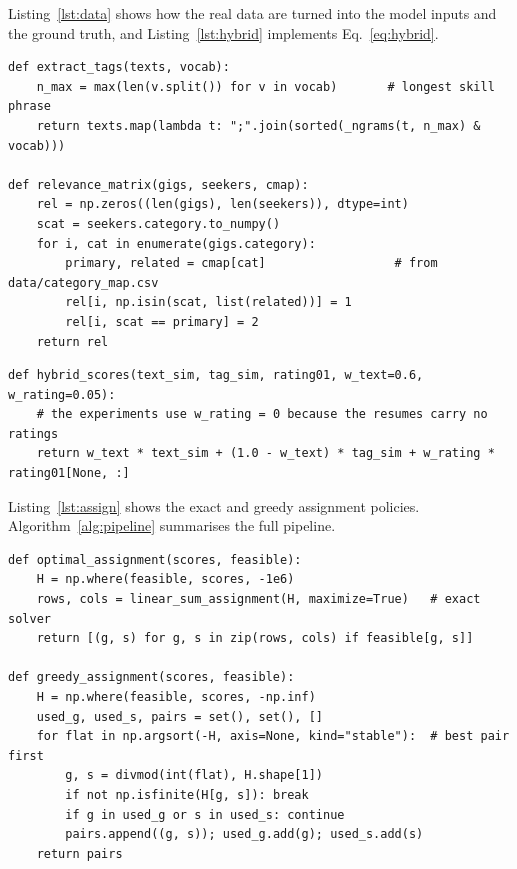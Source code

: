 \documentclass[12pt,a4paper]{article}
\numberwithin{equation}{section}
\theoremstyle{definition}
\theoremstyle{plain}
\begin{document}
Listing~\ref{lst:data} shows how the real data are turned into the model inputs and the ground truth, and Listing~\ref{lst:hybrid} implements Eq.~\eqref{eq:hybrid}.
\begin{lstlisting}[caption={Resume tags and graded relevance (excerpt of \texttt{giglink\_ai/real\_data.py}).},label={lst:data}]
def extract_tags(texts, vocab):
    n_max = max(len(v.split()) for v in vocab)       # longest skill phrase
    return texts.map(lambda t: ";".join(sorted(_ngrams(t, n_max) & vocab)))

def relevance_matrix(gigs, seekers, cmap):
    rel = np.zeros((len(gigs), len(seekers)), dtype=int)
    scat = seekers.category.to_numpy()
    for i, cat in enumerate(gigs.category):
        primary, related = cmap[cat]                  # from data/category_map.csv
        rel[i, np.isin(scat, list(related))] = 1
        rel[i, scat == primary] = 2
    return rel
\end{lstlisting}

\begin{lstlisting}[caption={Hybrid score (excerpt of \texttt{giglink\_ai/models.py}).},label={lst:hybrid}]
def hybrid_scores(text_sim, tag_sim, rating01, w_text=0.6, w_rating=0.05):
    # the experiments use w_rating = 0 because the resumes carry no ratings
    return w_text * text_sim + (1.0 - w_text) * tag_sim + w_rating * rating01[None, :]
\end{lstlisting}

Listing~\ref{lst:assign} shows the exact and greedy assignment policies. Algorithm~\ref{alg:pipeline} summarises the full pipeline.
\begin{lstlisting}[caption={Optimal and greedy assignment (excerpt of \texttt{giglink\_ai/assignment.py}).},label={lst:assign}]
def optimal_assignment(scores, feasible):
    H = np.where(feasible, scores, -1e6)
    rows, cols = linear_sum_assignment(H, maximize=True)   # exact solver
    return [(g, s) for g, s in zip(rows, cols) if feasible[g, s]]

def greedy_assignment(scores, feasible):
    H = np.where(feasible, scores, -np.inf)
    used_g, used_s, pairs = set(), set(), []
    for flat in np.argsort(-H, axis=None, kind="stable"):  # best pair first
        g, s = divmod(int(flat), H.shape[1])
        if not np.isfinite(H[g, s]): break
        if g in used_g or s in used_s: continue
        pairs.append((g, s)); used_g.add(g); used_s.add(s)
    return pairs
\end{lstlisting}
\end{document}
